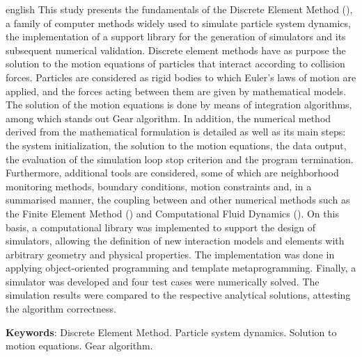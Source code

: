 \begin{resumo}[Abstract]
 \begin{otherlanguage*}{english}
   This study presents the fundamentals of the Discrete Element Method (\DEM{}), a family of computer methods widely used to simulate particle system dynamics, the implementation of a support library for the generation of simulators and its subsequent numerical validation. Discrete element methods have as purpose the solution to the motion equations of particles that interact according to collision forces. Particles are considered as rigid bodies to which Euler's laws of motion are applied, and the forces acting between them are given by mathematical models. The solution of the motion equations is done by means of integration algorithms, among which stands out Gear algorithm. In addition, the numerical method derived from the mathematical formulation is detailed as well as its main steps: the system initialization, the solution to the motion equations, the data output, the evaluation of the simulation loop stop criterion and the program termination. Furthermore, additional tools are considered, some of which are neighborhood monitoring methods, boundary conditions, motion constraints and, in a summarised manner, the coupling between \DEM{} and other numerical methods such as the Finite Element Method (\FEM{}) and Computational Fluid Dynamics (\CFD{}). On this basis, a computational library was implemented to support the design of \DEM{} simulators, allowing the definition of new interaction models and elements with arbitrary geometry and physical properties. The implementation was done in \CPP{} applying object-oriented programming and template metaprogramming. Finally, a simulator was developed and four test cases were numerically solved. The simulation results were compared to the respective analytical solutions, attesting the algorithm correctness.

   \vspace{\onelineskip}
 
   \noindent 
   \textbf{Keywords}: Discrete Element Method. Particle system dynamics. Solution to motion equations. Gear algorithm.
 \end{otherlanguage*}
\end{resumo}

%

